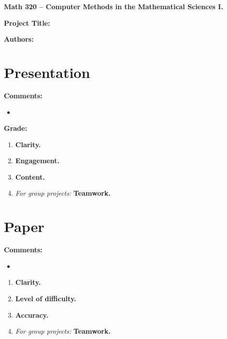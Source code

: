 \documentclass[12pt]{article}
\begin{document}
{\bf \large Math 320 -- Computer Methods in the Mathematical Sciences I.}\\

\vspace{3mm}

{\bf \large Project Title:}\\
\vspace{2mm}

{\bf \large Authors:}\\

\vspace{3mm}

\section{Presentation}
{\bf \large Comments:}
\begin{itemize}
\item
\end{itemize}

{\bf \large Grade:}

\begin{enumerate}
\item {\bf Clarity.} 
\item {\bf Engagement.} 
\item {\bf Content.}
\item {\em For group projects:} {\bf Teamwork.}
\end{enumerate}

\section{Paper}

{\bf \large Comments:}
\begin{itemize}
\item
\end{itemize}

\begin{enumerate}
\item {\bf Clarity.} 
\item {\bf Level of difficulty.} 
\item {\bf Accuracy.} 
\item {\em For group projects:} {\bf Teamwork.}
\end{enumerate}
\end{document}
